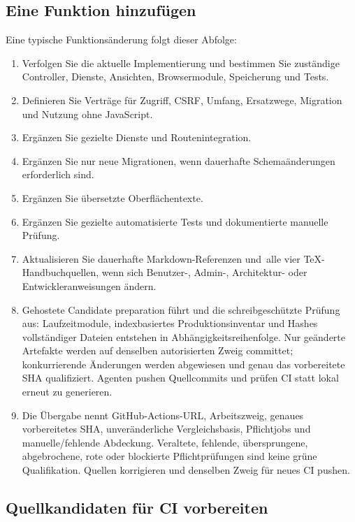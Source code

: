 \documentclass[11pt,a4paper]{article}
\newcommand{\filepath}[1]{\path{#1}}
\begin{document}
\subsection{Eine Funktion hinzufügen}

Eine typische Funktionsänderung folgt dieser Abfolge:

\begin{enumerate}
  \item Verfolgen Sie die aktuelle Implementierung und bestimmen Sie zuständige
  Controller, Dienste, Ansichten, Browsermodule, Speicherung und Tests.
  \item Definieren Sie Verträge für Zugriff, CSRF, Umfang, Ersatzwege, Migration
  und Nutzung ohne JavaScript.
  \item Ergänzen Sie gezielte Dienste und Routenintegration.
  \item Ergänzen Sie nur neue Migrationen, wenn dauerhafte Schemaänderungen
  erforderlich sind.
  \item Ergänzen Sie übersetzte Oberflächentexte.
  \item Ergänzen Sie gezielte automatisierte Tests und dokumentierte manuelle
  Prüfung.
  \item Aktualisieren Sie dauerhafte Markdown-Referenzen und~alle vier
  TeX-Handbuchquellen, wenn sich Benutzer-, Admin-, Architektur- oder
  Entwickleranweisungen ändern.
  \item Gehostete Candidate preparation führt
  \filepath{scripts/prepare_candidate.php} und die schreibgeschützte Prüfung
  aus: Laufzeitmodule, indexbasiertes Produktionsinventar und Hashes
  vollständiger Dateien entstehen in Abhängigkeitsreihenfolge. Nur geänderte
  Artefakte werden auf denselben autorisierten Zweig committet; konkurrierende
  Änderungen werden abgewiesen und genau das vorbereitete SHA qualifiziert.
  Agenten pushen Quellcommits und prüfen CI statt lokal erneut zu generieren.
  \item Die Übergabe nennt GitHub-Actions-URL, Arbeitszweig, genaues
  vorbereitetes SHA, unveränderliche Vergleichsbasis, Pflichtjobs und
  manuelle/fehlende Abdeckung. Veraltete, fehlende, übersprungene, abgebrochene,
  rote oder blockierte Pflichtprüfungen sind keine grüne Qualifikation. Quellen
  korrigieren und denselben Zweig für neues CI pushen.
\end{enumerate}

\subsection{Quellkandidaten für CI vorbereiten}
\end{document}
